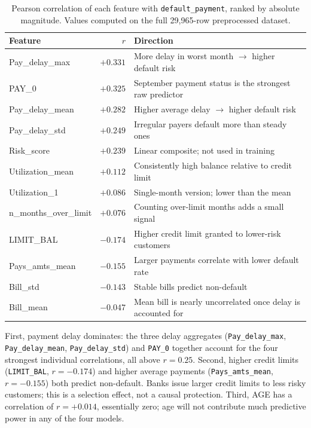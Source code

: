 \documentclass[12pt,a4paper]{article}
\begin{document}
\begin{table}[H]
\centering
\caption{Pearson correlation of each feature with \texttt{default\_payment},
         ranked by absolute magnitude. Values computed on the full 29,965-row
         preprocessed dataset.}
\label{tab:correlations}
\small
\begin{tabular}{lrl}
\toprule
Feature & $r$ & Direction \\
\midrule
Pay\_delay\_max    & $+0.331$ & More delay in worst month $\to$ higher default risk \\
PAY\_0             & $+0.325$ & September payment status is the strongest raw predictor \\
Pay\_delay\_mean   & $+0.282$ & Higher average delay $\to$ higher default risk \\
Pay\_delay\_std    & $+0.249$ & Irregular payers default more than steady ones \\
Risk\_score        & $+0.239$ & Linear composite; not used in training \\
Utilization\_mean  & $+0.112$ & Consistently high balance relative to credit limit \\
Utilization\_1     & $+0.086$ & Single-month version; lower than the mean \\
n\_months\_over\_limit & $+0.076$ & Counting over-limit months adds a small signal \\
\midrule
LIMIT\_BAL         & $-0.174$ & Higher credit limit granted to lower-risk customers \\
Pays\_amts\_mean   & $-0.155$ & Larger payments correlate with lower default rate \\
Bill\_std          & $-0.143$ & Stable bills predict non-default \\
Bill\_mean         & $-0.047$ & Mean bill is nearly uncorrelated once delay is accounted for \\
\bottomrule
\end{tabular}
\end{table}

First, payment delay dominates: the three delay aggregates
(\texttt{Pay\_delay\_max}, \texttt{Pay\_delay\_mean}, \texttt{Pay\_delay\_std})
and \texttt{PAY\_0} together account for the four strongest individual
correlations, all above $r = 0.25$. Second, higher credit limits
(\texttt{LIMIT\_BAL}, $r = -0.174$) and higher average payments
(\texttt{Pays\_amts\_mean}, $r = -0.155$) both predict non-default.
Banks issue larger credit limits to less risky customers; this is a
selection effect, not a causal protection. Third, AGE has a correlation
of $r = +0.014$, essentially zero; age will not contribute much predictive
power in any of the four models.
\end{document}
